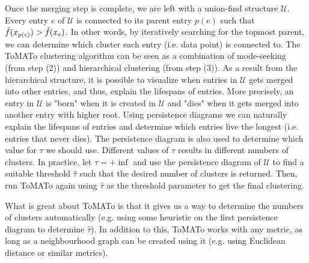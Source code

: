 Once the merging step is complete, we are left with a union-find structure $\mathcal{U}$. Every entry $e$ of $\mathcal{U}$ is connected to its parent entry $p(e)$ such that $\Tilde{f}(x_{p(e)}) > \Tilde{f}(x_e)$. In other words, by iteratively searching for the topmost parent, we can determine which cluster each entry (i.e. data point) is connected to. The ToMATo clustering algorithm can be seen as a combination of mode-seeking (from step (2)) and hierarchical clustering (from step (3)). As a result from the hierarchical structure, it is possible to visualize when entries in $\mathcal{U}$ gets merged into other entries, and thus, explain the lifespans of entries. More precisely, an entry in $\mathcal{U}$ is "born" when it is created in $\mathcal{U}$ and "dies" when it gets merged into another entry with higher root. Using persistence diagrams we can naturally explain the lifespans of entries and determine which entries live the longest (i.e. entries that never dies). The persistence diagram is also used to determine which value for $\tau$ we should use. Different values of $\tau$ results in different numbers of clusters. In practice, let $\tau = +\inf$ and use the persistence diagram of $\mathcal{U}$ to find a suitable threshold $\hat{\tau}$ such that the desired number of clusters is returned. Then, run ToMATo again using $\hat{\tau}$ as the threshold parameter to get the final clustering.

What is great about ToMATo is that it gives us a way to determine the numbers of clusters automatically (e.g. using some heuristic on the first persistence diagram to determine $\hat{\tau}$). In addition to this, ToMATo works with any metric, as long as a neighbourhood graph can be created using it (e.g. using Euclidean distance or similar metrics).

